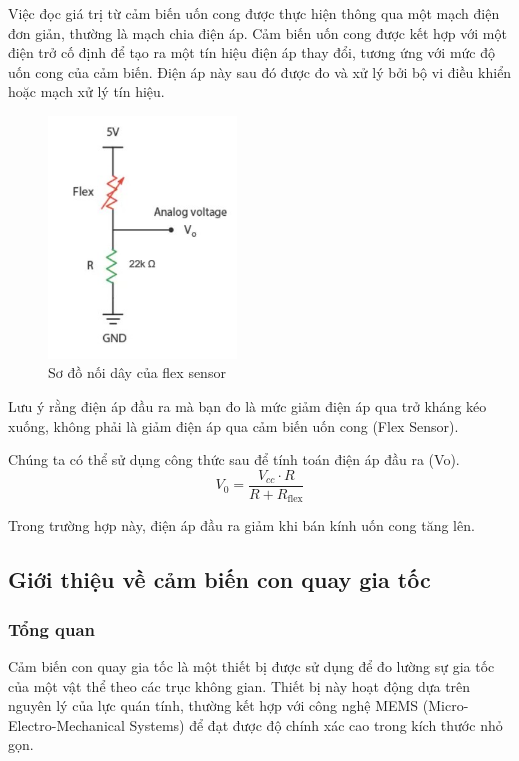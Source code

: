 \indent Việc đọc giá trị từ cảm biến uốn cong được thực hiện thông qua một mạch điện đơn giản, thường là mạch chia điện áp. Cảm biến uốn cong được kết hợp với một điện trở cố định để tạo ra một tín hiệu điện áp thay đổi, tương ứng với mức độ uốn cong của cảm biến. Điện áp này sau đó được đo và xử lý bởi bộ vi điều khiển hoặc mạch xử lý tín hiệu.

\begin{figure}[H]
    \centering
    \includegraphics[width=5cm]{Images/Theoretical basis/flex sensor 2.jpg}
\caption{Sơ đồ nối dây của flex sensor}
\end{figure}

\indent Lưu ý rằng điện áp đầu ra mà bạn đo là mức giảm điện áp qua trở kháng kéo xuống, không phải là giảm điện áp qua cảm biến uốn cong (Flex Sensor).

\indent Chúng ta có thể sử dụng công thức sau để tính toán điện áp đầu ra (Vo).
\[ V_0 = \frac{V_{cc} \cdot R}{R + R_{\text{flex}}} \]

\indent Trong trường hợp này, điện áp đầu ra giảm khi bán kính uốn cong tăng lên.
\subsection{Giới thiệu về cảm biến con quay gia tốc}
\subsubsection{Tổng quan}
\indent Cảm biến con quay gia tốc là một thiết bị được sử dụng để đo lường sự gia tốc của một vật thể theo các trục không gian. Thiết bị này hoạt động dựa trên nguyên lý của lực quán tính, thường kết hợp với công nghệ MEMS (Micro-Electro-Mechanical Systems) để đạt được độ chính xác cao trong kích thước nhỏ gọn.

